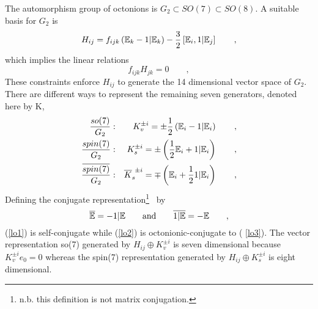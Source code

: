\documentclass[a4paper,12pt]{book}
\begin{document}
The automorphism group of octonions is $G_{2}\subset SO(7)\subset SO(8)$. A
suitable basis for $G_{2}$ is \cite{c10}\cite{luk}\cite{gunn1}\cite{gunket} 
\begin{equation}
H_{ij}=f_{ijk}\left( \Bbb{E}_{k}-1|\Bbb{E}_{k}\right) -\frac{3}{2}\left[ 
\Bbb{E}_{i},1|\Bbb{E}_{j}\right] \qquad ,
\end{equation}
which implies the linear relations 
\begin{equation}
f_{ijk}H_{jk}=0\qquad ,
\end{equation}
These constraints enforce $H_{ij}$ to generate the 14 dimensional vector
space of $G_{2}$. There are different ways to represent the remaining seven
generators, denoted here by K, 
\begin{eqnarray}
\frac{so(7)}{G_{2}} &:&K_{v}^{\pm i}=\pm \frac{1}{2}\left( \Bbb{E}_{i}-1|%
\Bbb{E}_{i}\right) \qquad ,  \label{lo1} \\
\frac{spin(7)}{G_{2}} &:&K_{s}^{\pm i}=\pm \left( \frac{1}{2}\Bbb{E}_{i}+1|%
\Bbb{E}_{i}\right) \qquad ,  \label{lo2} \\
\frac{\overline{spin(7)}}{G_{2}} &:&{\overline{K}}_{s}^{\ \pm i}=\mp \left( 
\Bbb{E}_{i}+\frac{1}{2}1|\Bbb{E}_{i}\right) \qquad ,  \label{lo3}
\end{eqnarray}
Defining the conjugate representation\footnote{%
n.b. this definition is not matrix conjugation.} \ by 
\begin{equation}
{\overline{\Bbb{E}}}=-1|\Bbb{E}\qquad \mbox{and\qquad }{\overline{1|\Bbb{E}}}%
=-\Bbb{E}\qquad ,
\end{equation}
(\ref{lo1}) is self-conjugate while (\ref{lo2}) is octonionic-conjugate to (%
\ref{lo3}). The vector representation so(7) generated by $H_{ij}\oplus
K_{v}^{\pm i}$ is seven dimensional because $K_{v}^{\pm i}e_{0}=0$ whereas
the spin(7) representation generated by $H_{ij}\oplus K_{s}^{\pm i}$ is
eight dimensional.
\end{document}
